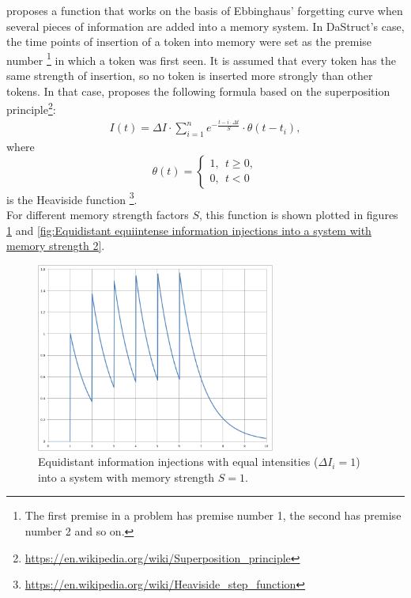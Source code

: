\documentclass[hidelinks]{scrartcl}
\begin{document}
\cite*{Yffelti.2016} proposes a function that works on the basis of Ebbinghaus' forgetting curve when several pieces of information are added into a memory system. In DaStruct's case, the time points of insertion of a token into memory were set as the premise number \footnote{The first premise in a problem has premise number 1, the second has premise number 2 and so on.} in which a token was first seen. It is assumed that every token has the same strength of insertion, so no token is inserted more strongly than other tokens. In that case, \cite{Yffelti.2016} proposes the following formula based on the superposition principle\footnote{\url{https://en.wikipedia.org/wiki/Superposition_principle}}:
\begin{gather}
I(t) = \Delta I \cdot \sum \limits_{i=1}^n  e^{-\frac{t-i \cdot \Delta t}{S}} \cdot \theta(t - t_i),
\end{gather}
where 
\begin{equation}
  \theta(t)=\begin{cases}
               1, ~~t \geq 0, \\
               0, ~~t < 0
            \end{cases}
\end{equation}
is the Heaviside function \footnote{\url{https://en.wikipedia.org/wiki/Heaviside_step_function}}. \\

For different memory strength factors $S$, this function is shown plotted in figures \ref{fig:Equidistant equiintense information injections into a system with memory strength 1} and \ref{fig:Equidistant equiintense information injections into a system with memory strength 2}.

\begin{figure}[H]
\centering
\includegraphics[width=0.7\textwidth]{Illustrations/Equidistant_equiintense_with_S=1.png}
\caption{Equidistant information injections with equal intensities ($\Delta I_i = 1$) into a system with memory strength $S=1$.}
\label{fig:Equidistant equiintense information injections into a system with memory strength 1}
\end{figure}
\end{document}
